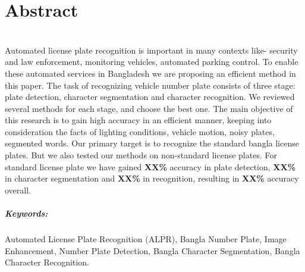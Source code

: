 \documentclass{standalone}
\begin{document}
\chapter*{Abstract}

\\

Automated license plate recognition is important in many contexts like- security and law enforcement, monitoring vehicles, automated parking control. To enable these automated services in Bangladesh we are proposing an efficient method in this paper. The task of recognizing vehicle number plate consists of three stage: plate detection, character segmentation and character recognition. We reviewed several methods for each stage, and choose the best one. The main objective of this research is to gain high accuracy in an efficient manner, keeping into consideration the facts of lighting conditions, vehicle motion, noisy plates, segmented words. Our primary target is to recognize the standard bangla license plates. But we also tested our methods on non-standard license plates.
%
For standard license plate we have gained {\bf XX\%} accuracy in plate detection, {\bf XX\%} in character segmentation and {\bf XX\%} in recognition, resulting in {\bf XX\%} accuracy overall.


\vspace{1.0cm}

\paragraph*{Keywords:} Automated License Plate Recognition (ALPR), Bangla Number Plate, Image Enhancement, Number Plate Detection, Bangla Character Segmentation,  Bangla Character Recognition. 
\end{document}
